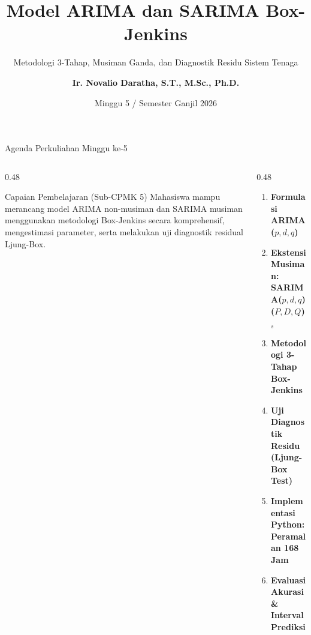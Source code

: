 \documentclass[aspectratio=169, 10pt]{beamer}
\title[\textbf{Deret Waktu (Minggu 5)}]{\textbf{Model ARIMA dan SARIMA Box-Jenkins}}
\subtitle{Metodologi 3-Tahap, Musiman Ganda, dan Diagnostik Residu Sistem Tenaga}
\author[\textbf{Ir. Novalio Daratha, Ph.D.}]{\textbf{Ir. Novalio Daratha, S.T., M.Sc., Ph.D.}}
\institute[FT UNIB]{Program Studi Teknik Elektro -- Fakultas Teknik\\Universitas Bengkulu}
\date{Minggu 5 / Semester Ganjil 2026}
\begin{document}
\begin{frame}[plain]
    \titlepage
\end{frame}

\begin{frame}{Agenda Perkuliahan Minggu ke-5}
    \begin{columns}[T]
        \begin{column}{0.48\textwidth}
            \begin{block}{Capaian Pembelajaran (Sub-CPMK 5)}
                Mahasiswa mampu merancang model ARIMA non-musiman dan SARIMA musiman menggunakan metodologi Box-Jenkins secara komprehensif, mengestimasi parameter, serta melakukan uji diagnostik residual Ljung-Box.
            \end{block}
        \end{column}
        \begin{column}{0.48\textwidth}
            \begin{enumerate}
                \item \textbf{Formulasi ARIMA($p,d,q$)}
                \item \textbf{Ekstensi Musiman: SARIMA($p,d,q$)($P,D,Q$)$_s$}
                \item \textbf{Metodologi 3-Tahap Box-Jenkins}
                \item \textbf{Uji Diagnostik Residu (Ljung-Box Test)}
                \item \textbf{Implementasi Python: Peramalan 168 Jam}
                \item \textbf{Evaluasi Akurasi \& Interval Prediksi}
            \end{enumerate}
        \end{column}
    \end{columns}
\end{frame}
\end{document}
